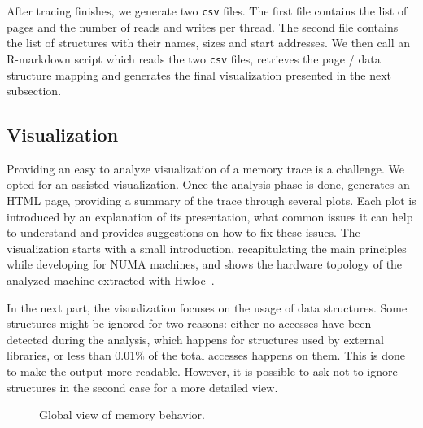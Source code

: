 After tracing finishes, we generate two \texttt{csv} files.
The first file contains the list of pages and the number of reads
and writes per thread. The second file contains the
list of structures with their names, sizes and start addresses.
We then call an R-markdown script which reads the two \texttt{csv} files,
retrieves the page / data structure mapping and generates the final
visualization presented in the next subsection.


\subsection{Visualization}
\label{sec:design-visu}

Providing an easy to analyze visualization of a memory trace is a challenge. We
opted for an assisted visualization. Once the analysis phase is done, \TABARNAC
generates an HTML page, providing a summary of the trace through several
plots. Each plot is
introduced by an explanation of its presentation, what common issues it can
help to understand and provides suggestions on how to fix these issues.
The visualization starts with a small introduction, recapitulating the main
principles while developing for NUMA machines, and shows the hardware topology of the analyzed machine extracted with Hwloc~\cite{Broquedis10hwloc}.

In the next part, the visualization focuses on the usage of data structures. Some
structures might be ignored for two reasons: either no accesses have been
detected during the analysis, which happens for structures used by external
libraries, or less than 0.01\% of the total accesses happens on them. This is
done to make the output more readable. However, it is possible to ask
\TABARNAC not to ignore structures in the second case for a more detailed view.

\begin{figure}[htb]
    \centering
    \label{fig:example_plot1}
    \caption{Global view of memory behavior.}
\end{figure}

